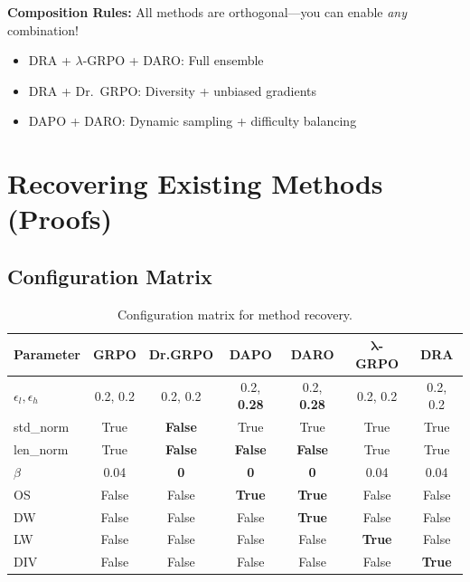 \documentclass[11pt,a4paper]{article}
\begin{document}
\begin{tipbox}
\textbf{Composition Rules:} All methods are orthogonal—you can enable \emph{any} combination!
\begin{itemize}
    \item DRA + $\lambda$-GRPO + DARO: Full ensemble
    \item DRA + Dr.~GRPO: Diversity + unbiased gradients
    \item DAPO + DARO: Dynamic sampling + difficulty balancing
\end{itemize}
\end{tipbox}

\newpage


\section{Recovering Existing Methods (Proofs)}

\subsection{Configuration Matrix}

\begin{table}[H]
\centering
\small
\begin{tabular}{@{}lcccccc@{}}
\toprule
\textbf{Parameter} & \textbf{GRPO} & \textbf{Dr.GRPO} & \textbf{DAPO} & \textbf{DARO} & $\bm{\lambda}$\textbf{-GRPO} & \textbf{DRA} \\
\midrule
$\epsilon_l, \epsilon_h$ & 0.2, 0.2 & 0.2, 0.2 & 0.2, \textbf{0.28} & 0.2, \textbf{0.28} & 0.2, 0.2 & 0.2, 0.2 \\
std\_norm & True & \textbf{False} & True & True & True & True \\
len\_norm & True & \textbf{False} & \textbf{False} & \textbf{False} & True & True \\
$\beta$ & 0.04 & \textbf{0} & \textbf{0} & \textbf{0} & 0.04 & 0.04 \\
OS & False & False & \textbf{True} & \textbf{True} & False & False \\
DW & False & False & False & \textbf{True} & False & False \\
LW & False & False & False & False & \textbf{True} & False \\
DIV & False & False & False & False & False & \textbf{True} \\
\bottomrule
\end{tabular}
\caption{Configuration matrix for method recovery.}
\end{table}
\end{document}
